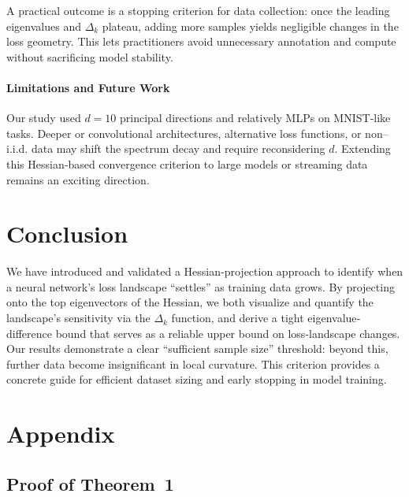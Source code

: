 \documentclass{article}
\begin{document}
A practical outcome is a stopping criterion for data collection: once the leading eigenvalues and $\Delta_k$ plateau,
adding more samples yields negligible changes in the loss geometry.  This lets practitioners avoid unnecessary annotation and
compute without sacrificing model stability.

\paragraph{Limitations and Future Work}
Our study used $d=10$ principal directions and relatively MLPs on MNIST‐like tasks. Deeper or convolutional architectures,
alternative loss functions, or non–i.i.d. data may shift the spectrum decay and require reconsidering $d$. Extending this Hessian‐based
convergence criterion to large models or streaming data remains an exciting direction.


\section{Conclusion}\label{sec:concl}

We have introduced and validated a Hessian‐projection approach to identify when a neural network’s loss landscape “settles” as
training data grows. By projecting onto the top eigenvectors of the Hessian, we both visualize and quantify the landscape’s
sensitivity via the $\Delta_k$ function, and derive a tight eigenvalue‐difference bound that serves as a reliable upper bound on
loss‐landscape changes. Our results demonstrate a clear “sufficient sample size” threshold: beyond this, further data become
insignificant in local curvature. This criterion provides a concrete guide for efficient dataset sizing and early stopping in
model training.







\newpage
\appendix
\section{Appendix}\label{app}

\subsection{Proof of Theorem~1}\label{app:th_1}
\end{document}
